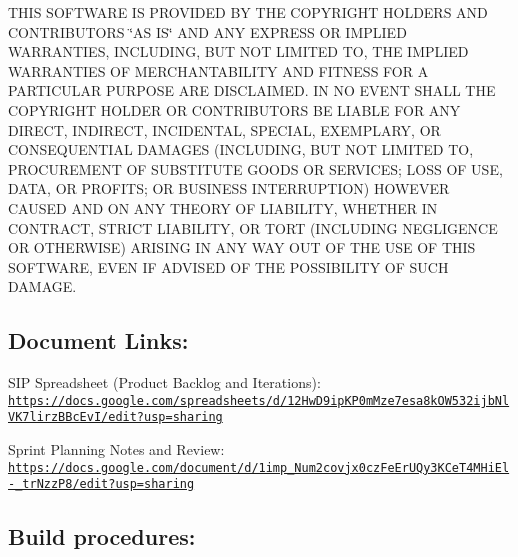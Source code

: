 T\+H\+IS S\+O\+F\+T\+W\+A\+RE IS P\+R\+O\+V\+I\+D\+ED BY T\+HE C\+O\+P\+Y\+R\+I\+G\+HT H\+O\+L\+D\+E\+RS A\+ND C\+O\+N\+T\+R\+I\+B\+U\+T\+O\+RS \char`\"{}\+A\+S I\+S\char`\"{} A\+ND A\+NY E\+X\+P\+R\+E\+SS OR I\+M\+P\+L\+I\+ED W\+A\+R\+R\+A\+N\+T\+I\+ES, I\+N\+C\+L\+U\+D\+I\+NG, B\+UT N\+OT L\+I\+M\+I\+T\+ED TO, T\+HE I\+M\+P\+L\+I\+ED W\+A\+R\+R\+A\+N\+T\+I\+ES OF M\+E\+R\+C\+H\+A\+N\+T\+A\+B\+I\+L\+I\+TY A\+ND F\+I\+T\+N\+E\+SS F\+OR A P\+A\+R\+T\+I\+C\+U\+L\+AR P\+U\+R\+P\+O\+SE A\+RE D\+I\+S\+C\+L\+A\+I\+M\+ED. IN NO E\+V\+E\+NT S\+H\+A\+LL T\+HE C\+O\+P\+Y\+R\+I\+G\+HT H\+O\+L\+D\+ER OR C\+O\+N\+T\+R\+I\+B\+U\+T\+O\+RS BE L\+I\+A\+B\+LE F\+OR A\+NY D\+I\+R\+E\+CT, I\+N\+D\+I\+R\+E\+CT, I\+N\+C\+I\+D\+E\+N\+T\+AL, S\+P\+E\+C\+I\+AL, E\+X\+E\+M\+P\+L\+A\+RY, OR C\+O\+N\+S\+E\+Q\+U\+E\+N\+T\+I\+AL D\+A\+M\+A\+G\+ES (I\+N\+C\+L\+U\+D\+I\+NG, B\+UT N\+OT L\+I\+M\+I\+T\+ED TO, P\+R\+O\+C\+U\+R\+E\+M\+E\+NT OF S\+U\+B\+S\+T\+I\+T\+U\+TE G\+O\+O\+DS OR S\+E\+R\+V\+I\+C\+ES; L\+O\+SS OF U\+SE, D\+A\+TA, OR P\+R\+O\+F\+I\+TS; OR B\+U\+S\+I\+N\+E\+SS I\+N\+T\+E\+R\+R\+U\+P\+T\+I\+ON) H\+O\+W\+E\+V\+ER C\+A\+U\+S\+ED A\+ND ON A\+NY T\+H\+E\+O\+RY OF L\+I\+A\+B\+I\+L\+I\+TY, W\+H\+E\+T\+H\+ER IN C\+O\+N\+T\+R\+A\+CT, S\+T\+R\+I\+CT L\+I\+A\+B\+I\+L\+I\+TY, OR T\+O\+RT (I\+N\+C\+L\+U\+D\+I\+NG N\+E\+G\+L\+I\+G\+E\+N\+CE OR O\+T\+H\+E\+R\+W\+I\+SE) A\+R\+I\+S\+I\+NG IN A\+NY W\+AY O\+UT OF T\+HE U\+SE OF T\+H\+IS S\+O\+F\+T\+W\+A\+RE, E\+V\+EN IF A\+D\+V\+I\+S\+ED OF T\+HE P\+O\+S\+S\+I\+B\+I\+L\+I\+TY OF S\+U\+CH D\+A\+M\+A\+GE.

\subsection*{Document Links\+:}

S\+IP Spreadsheet (Product Backlog and Iterations)\+: \href{https://docs.google.com/spreadsheets/d/12HwD9ipKP0mMze7esa8kOW532ijbNlVK7lirzBBcEvI/edit?usp=sharing}{\tt https\+://docs.\+google.\+com/spreadsheets/d/12\+Hw\+D9ip\+K\+P0m\+Mze7esa8k\+O\+W532ijb\+Nl\+V\+K7lirz\+B\+Bc\+Ev\+I/edit?usp=sharing}

Sprint Planning Notes and Review\+: \href{https://docs.google.com/document/d/1imp_Num2covjx0czFeErUQy3KCeT4MHiEl-_trNzzP8/edit?usp=sharing}{\tt https\+://docs.\+google.\+com/document/d/1imp\+\_\+\+Num2covjx0cz\+Fe\+Er\+U\+Qy3\+K\+Ce\+T4\+M\+Hi\+El-\/\+\_\+tr\+Nzz\+P8/edit?usp=sharing}

\subsection*{Build procedures\+:}


